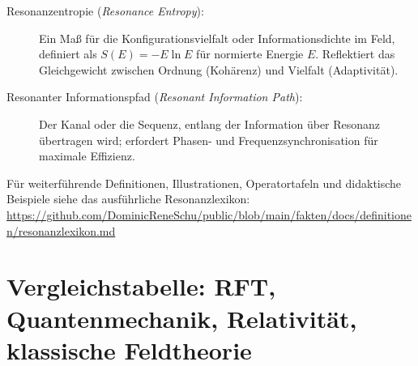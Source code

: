\documentclass[12pt]{article}
\begin{document}
\begin{description}
	\item[Resonanzentropie (\textit{Resonance Entropy}):]  
	Ein Maß für die Konfigurationsvielfalt oder Informationsdichte im Feld, definiert als $S(E) = -E \ln E$ für normierte Energie $E$. Reflektiert das Gleichgewicht zwischen Ordnung (Kohärenz) und Vielfalt (Adaptivität).
	
	\item[Resonanter Informationspfad (\textit{Resonant Information Path}):]  
	Der Kanal oder die Sequenz, entlang der Information über Resonanz übertragen wird; erfordert Phasen- und Frequenzsynchronisation für maximale Effizienz.
	
\end{description}

\noindent
Für weiterführende Definitionen, Illustrationen, Operatortafeln und didaktische Beispiele siehe das ausführliche Resonanzlexikon:\\
\url{https://github.com/DominicReneSchu/public/blob/main/fakten/docs/definitionen/resonanzlexikon.md}
\newpage

\section*{Vergleichstabelle: RFT, Quantenmechanik, Relativität, klassische Feldtheorie}
\end{document}
